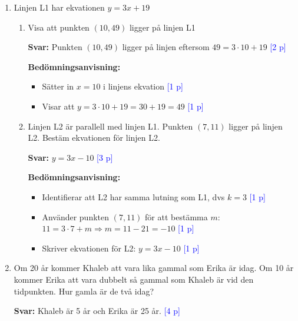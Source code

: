 \documentclass[12pt,a4paper]{article}
\newcommand{\points}[1]{\textcolor{blue}{[#1 p]}}
\begin{document}
\begin{enumerate}[label=\textbf{\arabic*.}]
    \item Linjen L1 har ekvationen $y = 3x + 19$
        \begin{enumerate}[label=\textbf{\alph*)}]
            \item Visa att punkten $(10,49)$ ligger på linjen L1
            
                \textbf{Svar:} Punkten $(10,49)$ ligger på linjen eftersom $49 = 3 \cdot 10 + 19$ \points{2}
                
                \textbf{Bedömningsanvisning:}
                \begin{itemize}
                    \item Sätter in $x = 10$ i linjens ekvation \points{1}
                    \item Visar att $y = 3 \cdot 10 + 19 = 30 + 19 = 49$ \points{1}
                \end{itemize}
                
            \item Linjen L2 är parallell med linjen L1. Punkten $(7,11)$ ligger på linjen L2. Bestäm ekvationen för linjen L2.
            
                \textbf{Svar:} $y = 3x - 10$ \points{3}
                
                \textbf{Bedömningsanvisning:}
                \begin{itemize}
                    \item Identifierar att L2 har samma lutning som L1, dvs $k = 3$ \points{1}
                    \item Använder punkten $(7,11)$ för att bestämma $m$: $11 = 3 \cdot 7 + m \Rightarrow m = 11 - 21 = -10$ \points{1}
                    \item Skriver ekvationen för L2: $y = 3x - 10$ \points{1}
                \end{itemize}
        \end{enumerate}

    \item Om 20 år kommer Khaleb att vara lika gammal som Erika är idag. Om 10 år kommer Erika att vara dubbelt så gammal som Khaleb är vid den tidpunkten. Hur gamla är de två idag?
    
        \textbf{Svar:} Khaleb är 5 år och Erika är 25 år. \points{4}
        

\end{enumerate}
\end{document}
